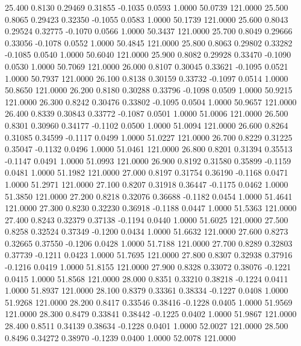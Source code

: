   25.400   0.8130   0.29469   0.31855  -0.1035   0.0593   1.0000  50.0739 121.0000
  25.500   0.8065   0.29423   0.32350  -0.1055   0.0583   1.0000  50.1739 121.0000
  25.600   0.8043   0.29524   0.32775  -0.1070   0.0566   1.0000  50.3437 121.0000
  25.700   0.8049   0.29666   0.33056  -0.1078   0.0552   1.0000  50.4845 121.0000
  25.800   0.8063   0.29802   0.33282  -0.1085   0.0540   1.0000  50.6040 121.0000
  25.900   0.8082   0.29928   0.33470  -0.1090   0.0530   1.0000  50.7069 121.0000
  26.000   0.8107   0.30045   0.33621  -0.1095   0.0521   1.0000  50.7937 121.0000
  26.100   0.8138   0.30159   0.33732  -0.1097   0.0514   1.0000  50.8650 121.0000
  26.200   0.8180   0.30288   0.33796  -0.1098   0.0509   1.0000  50.9215 121.0000
  26.300   0.8242   0.30476   0.33802  -0.1095   0.0504   1.0000  50.9657 121.0000
  26.400   0.8339   0.30843   0.33772  -0.1087   0.0501   1.0000  51.0006 121.0000
  26.500   0.8301   0.30960   0.34177  -0.1102   0.0500   1.0000  51.0094 121.0000
  26.600   0.8264   0.31085   0.34599  -0.1117   0.0499   1.0000  51.0227 121.0000
  26.700   0.8229   0.31225   0.35047  -0.1132   0.0496   1.0000  51.0461 121.0000
  26.800   0.8201   0.31394   0.35513  -0.1147   0.0491   1.0000  51.0993 121.0000
  26.900   0.8192   0.31580   0.35899  -0.1159   0.0481   1.0000  51.1982 121.0000
  27.000   0.8197   0.31754   0.36190  -0.1168   0.0471   1.0000  51.2971 121.0000
  27.100   0.8207   0.31918   0.36447  -0.1175   0.0462   1.0000  51.3850 121.0000
  27.200   0.8218   0.32076   0.36688  -0.1182   0.0454   1.0000  51.4641 121.0000
  27.300   0.8230   0.32230   0.36918  -0.1188   0.0447   1.0000  51.5363 121.0000
  27.400   0.8243   0.32379   0.37138  -0.1194   0.0440   1.0000  51.6025 121.0000
  27.500   0.8258   0.32524   0.37349  -0.1200   0.0434   1.0000  51.6632 121.0000
  27.600   0.8273   0.32665   0.37550  -0.1206   0.0428   1.0000  51.7188 121.0000
  27.700   0.8289   0.32803   0.37739  -0.1211   0.0423   1.0000  51.7695 121.0000
  27.800   0.8307   0.32938   0.37916  -0.1216   0.0419   1.0000  51.8155 121.0000
  27.900   0.8328   0.33072   0.38076  -0.1221   0.0415   1.0000  51.8568 121.0000
  28.000   0.8351   0.33210   0.38218  -0.1224   0.0411   1.0000  51.8937 121.0000
  28.100   0.8379   0.33361   0.38334  -0.1227   0.0408   1.0000  51.9268 121.0000
  28.200   0.8417   0.33546   0.38416  -0.1228   0.0405   1.0000  51.9569 121.0000
  28.300   0.8479   0.33841   0.38442  -0.1225   0.0402   1.0000  51.9867 121.0000
  28.400   0.8511   0.34139   0.38634  -0.1228   0.0401   1.0000  52.0027 121.0000
  28.500   0.8496   0.34272   0.38970  -0.1239   0.0400   1.0000  52.0078 121.0000
